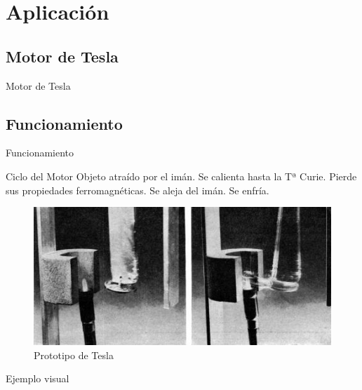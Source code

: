 \documentclass[10pt]{beamer}
\begin{document}
\section{\textrm{Aplicación}}
    \subsection{\textrm{Motor de Tesla}}
        \begin{frame}{\textrm{Motor de Tesla}}

        \end{frame}
    \subsection{\textrm{Funcionamiento}}
        \begin{frame}{Funcionamiento}
            \begin{block}{Ciclo del Motor}
                    \newline Objeto atraído por el imán.
                    \newline Se calienta hasta la Tª Curie.
                    \newline Pierde sus propiedades ferromagnéticas.
                    \newline Se aleja del imán.
                    \newline Se enfría. 
            \end{block}
            
            \begin{figure}
                \centering
                \includegraphics[scale=0.4]{image.png}
                \caption{Prototipo de Tesla}
                \label{fig:Tesla}
            \end{figure}
        \end{frame}

    \begin{frame}{Ejemplo visual}

        
    \end{frame}

\end{document}
